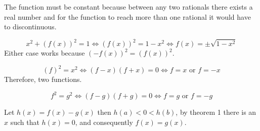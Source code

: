 \begin{problem}
	The function must be constant because between any two rationals there exists a real number and for the function to reach more than one rational it would have to discontinuous.
\end{problem}

\begin{problem}
	$$x^2+(f(x))^2=1 \iff (f(x))^2=1-x^2 \iff f(x)=\pm \sqrt{1-x^2}$$
	Either case works because $(-f(x))^2=(f(x))^2$.
\end{problem}

\begin{problem}
	$$(f)^2=x^2\iff (f-x)(f+x)=0 \iff f=x \text{ or } f=-x$$
	Therefore, two functions.
\end{problem}

\begin{problem}
	$$f^2=g^2 \iff (f-g)(f+g)=0 \iff f=g \text{ or } f=-g$$
\end{problem}

\begin{problem}
\end{problem}

\begin{problem}
	Let $h(x)=f(x)-g(x)$ then $h(a)<0<h(b)$, by theorem 1 there is an $x$ such that $h(x)=0$, and consequently $f(x)=g(x)$.
\end{problem}
